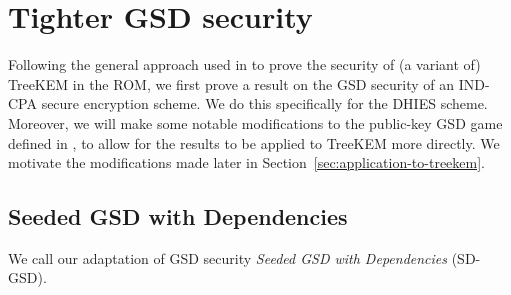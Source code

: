\chapter{Tighter GSD security}


Following the general approach used in \cite{ttkem} to prove the security of (a variant of) TreeKEM in the ROM, we first prove a result on the GSD security of an IND-CPA secure encryption scheme. We do this specifically for the DHIES scheme. Moreover, we will make some notable modifications to the public-key GSD game defined in \cite{ttkem}, to allow for the results to be applied to TreeKEM more directly. We motivate the modifications made later in Section~\vref{sec:application-to-treekem}.

\section{Seeded GSD with Dependencies}

We call our adaptation of GSD security \emph{Seeded GSD with Dependencies} (SD-GSD).


